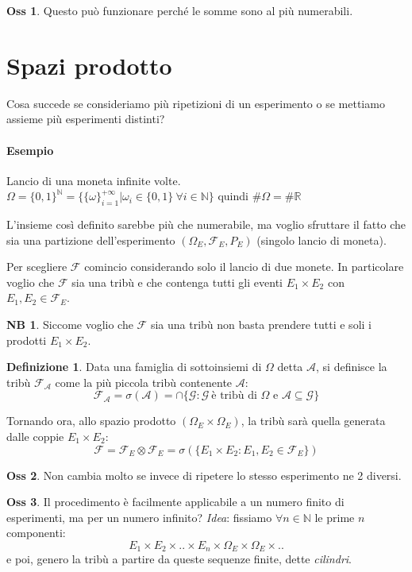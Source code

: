 \documentclass[12pt, a4paper]{report}
\theoremstyle{definition}
\newtheorem{definition}{Definizione}[section]
\newtheorem*{observation}{Oss}
\newtheorem*{note}{NB}
\DeclareRobustCommand{\F}{\mathcal{F}}%
\DeclareRobustCommand{\R}{\mathbb{R}}%
\DeclareRobustCommand{\N}{\mathbb{N}}%
\begin{document}
\begin{observation}
	Questo può funzionare perché le somme sono al più numerabili.
\end{observation}
\section{Spazi prodotto}
Cosa succede se consideriamo più ripetizioni di un esperimento o se mettiamo
assieme più esperimenti distinti?

\paragraph*{Esempio}
Lancio di una moneta infinite volte.\\
\(\Omega=\{0,1\}^\N=\{\{\omega\}_{i=1}^{+\infty}|\omega_i\in\{0,1\}\ 
\forall i\in\N\}\) quindi \(\#\Omega=\#\R\)

L'insieme così definito sarebbe più che numerabile, ma voglio sfruttare il
fatto che sia una partizione dell'esperimento \((\Omega_E, \F_E,P_E)\)
(singolo lancio di moneta).

Per scegliere $\F$ comincio considerando solo il lancio di due monete. In
particolare voglio che $\F$ sia una tribù e che contenga tutti gli eventi
\(E_1\times E_2\) con \(E_1,E_2\in\F_E\).
\begin{note}
	Siccome voglio che $\F$ sia una tribù non basta prendere tutti e
	soli i prodotti \(E_1\times E_2\).
\end{note}

\begin{definition}
	Data una famiglia di sottoinsiemi di $\Omega$ detta $\mathcal{A}$, si
	definisce la tribù $\F_\mathcal{A}$ come la più piccola tribù contenente
	$\mathcal{A}$:
	\[\F_\mathcal{A}=\sigma(\mathcal{A})=\cap\{\mathcal{G}:\mathcal{G}\ 
	\text{è tribù di $\Omega$ e \(\mathcal{A}\subseteq\mathcal{G}\)}\}\]
\end{definition}

Tornando ora, allo spazio prodotto \((\Omega_E\times\Omega_E)\), la tribù
sarà quella generata dalle coppie \(E_1\times E_2\):
\[\F=\F_E\otimes\F_E=\sigma(\{E_1\times E_2: E_1,E_2\in\F_E\})\]

\begin{observation}
	Non cambia molto se invece di ripetere lo stesso esperimento ne 2 diversi.
\end{observation}
\begin{observation}
	Il procedimento è facilmente applicabile a un numero finito di
	esperimenti, ma per un numero infinito?
	\emph{Idea}: fissiamo \(\forall n\in\N\) le prime $n$ componenti:
	\[E_1\times E_2\times ..\times E_n\times\Omega_E\times\Omega_E\times ..\]
	e poi, genero la tribù a partire da queste sequenze finite, dette \emph{cilindri}.
\end{observation}
\end{document}
